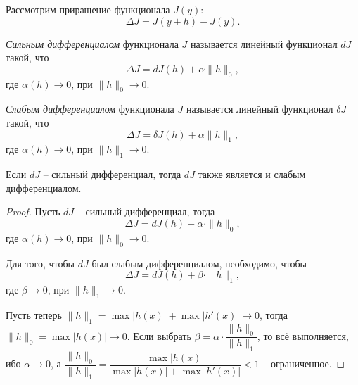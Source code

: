 
Рассмотрим приращение функционала $J (y)$:
\[
  \Delta J = J(y + h) - J(y).
\]

\begin{definition}
  \emph{Сильным дифференциалом} функционала $J$ называется линейный функционал $dJ$ такой, что
  \[
    \Delta J = dJ (h) + \alpha \|h\|_0,
  \]
  где $\alpha(h) \to 0$, при $\|h\|_0 \to 0$.
\end{definition}

\begin{definition}
  \emph{Слабым дифференциалом} функционала $J$ называется линейный функционал $\delta J$ такой, что
  \[
    \Delta J = \delta J (h) + \alpha \|h\|_1,
  \]
  где $\alpha(h) \to 0$, при $\|h\|_1 \to 0$.
\end{definition}

\begin{theorem}
  Если $dJ$ -- сильный дифференциал, тогда $dJ$ также является и слабым дифференциалом.
\end{theorem}
\begin{proof}
  Пусть $dJ$ -- сильный дифференциал, тогда 
  \[
    \Delta J = dJ(h) + \alpha \cdot \|h\|_0,
  \]
  где $\alpha(h) \to 0$, при $\|h\|_0 \to 0$.

  Для того, чтобы $dJ$ был слабым дифференциалом, необходимо, чтобы 
  \[
    \Delta J = dJ(h) + \beta \cdot \|h\|_1,
  \]
  где $\beta \to 0$, при $\|h\|_1 \to 0$.

  Пусть теперь $\|h\|_1 = \max |h(x)| + \max |h'(x)| \to 0$, тогда $\|h\|_0 = \max |h(x)| \to 0$.
  Если выбрать $\beta = \alpha \cdot \dfrac{\|h\|_0}{\|h\|_1}$, то всё выполняется, ибо
  $\alpha \to 0$, а
  $\dfrac{\|h\|_0}{\|h\|_1} = \dfrac{\max |h(x)|}{\max |h(x)| + \max |h'(x)|} < 1$ -- ограниченное.
\end{proof}



